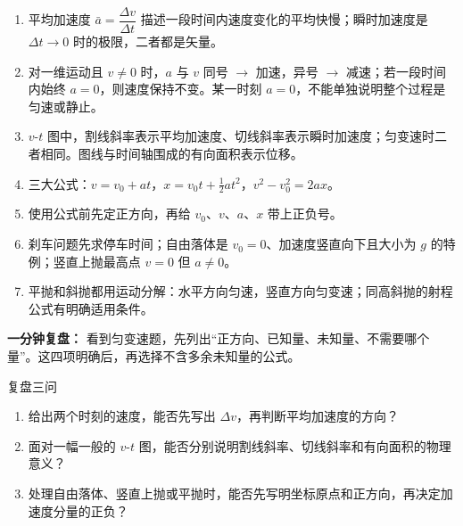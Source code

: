 \begin{enumerate}
  \item 平均加速度 $\bar a=\dfrac{\Delta v}{\Delta t}$ 描述一段时间内速度变化的平均快慢；瞬时加速度是 $\Delta t\to0$ 时的极限，二者都是矢量。
  \item 对一维运动且 $v\neq0$ 时，$a$ 与 $v$ 同号 $\to$ 加速，异号 $\to$ 减速；若一段时间内始终 $a=0$，则速度保持不变。某一时刻 $a=0$，不能单独说明整个过程是匀速或静止。
  \item $v$-$t$ 图中，割线斜率表示平均加速度、切线斜率表示瞬时加速度；匀变速时二者相同。图线与时间轴围成的有向面积表示位移。
  \item 三大公式：$v = v_0 + at$，$x = v_0 t + \frac12 a t^2$，$v^2 - v_0^2 = 2ax$。
  \item 使用公式前先定正方向，再给 $v_0$、$v$、$a$、$x$ 带上正负号。
  \item 刹车问题先求停车时间；自由落体是 $v_0=0$、加速度竖直向下且大小为 $g$ 的特例；竖直上抛最高点 $v=0$ 但 $a\neq0$。
  \item 平抛和斜抛都用运动分解：水平方向匀速，竖直方向匀变速；同高斜抛的射程公式有明确适用条件。
\end{enumerate}

\textbf{一分钟复盘：} 看到匀变速题，先列出“正方向、已知量、未知量、不需要哪个量”。这四项明确后，再选择不含多余未知量的公式。

\begin{learningbox}{复盘三问}
\begin{enumerate}
  \item 给出两个时刻的速度，能否先写出 $\Delta v$，再判断平均加速度的方向？
  \item 面对一幅一般的 $v$-$t$ 图，能否分别说明割线斜率、切线斜率和有向面积的物理意义？
  \item 处理自由落体、竖直上抛或平抛时，能否先写明坐标原点和正方向，再决定加速度分量的正负？
\end{enumerate}
\end{learningbox}
